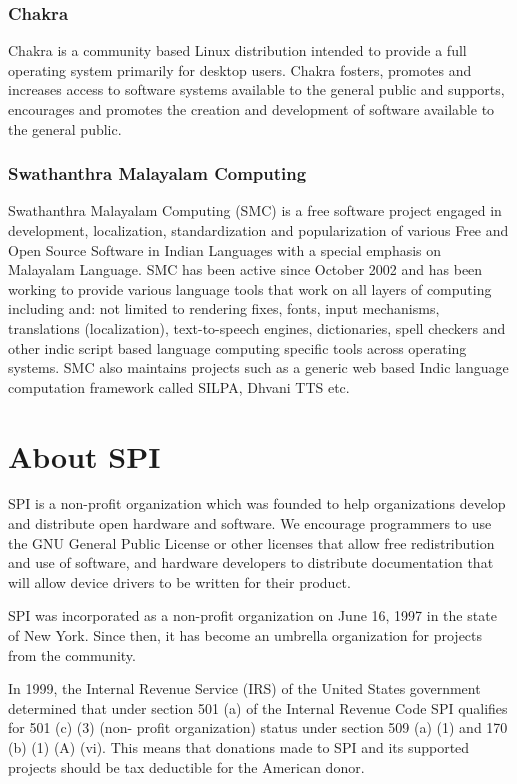 \documentclass[letterpaper]{report}
\begin{document}
\subsection{Chakra}

Chakra is a community based Linux distribution intended to provide a full
operating system primarily for desktop users.  Chakra fosters, promotes and
increases access to software systems available to the general public and
supports, encourages and promotes the creation and development of software
available to the general public.


\subsection{Swathanthra Malayalam Computing}

Swathanthra Malayalam Computing (SMC) is a free software project engaged
in development, localization, standardization and popularization of
various Free and Open Source Software in Indian Languages with a special
emphasis on Malayalam Language. SMC has been active since October 2002 and
has been working to provide various language tools that work on all layers
of computing including and: not limited to rendering fixes, fonts, input
mechanisms, translations (localization), text-to-speech engines,
dictionaries, spell checkers and other indic script based language
computing specific tools across operating systems. SMC also maintains
projects such as a generic web based Indic language computation framework
called SILPA, Dhvani TTS etc.


\appendix
\chapter{About SPI}

SPI is a non-profit organization which was founded to help organizations
develop and distribute open hardware and software. We encourage programmers
to use the GNU General Public License or other licenses that allow free
redistribution and use of software, and hardware developers to distribute
documentation that will allow device drivers to be written for their product.

SPI was incorporated as a non-profit organization on June 16, 1997 in the state
of New York. Since then, it has become an umbrella organization for projects
from the community.

In 1999, the Internal Revenue Service (IRS) of the United States government
determined that under section 501 (a) of the Internal Revenue Code SPI
qualifies for 501 (c) (3) (non- profit organization) status under section 509
(a) (1) and 170 (b) (1) (A) (vi). This means that donations made to SPI and its
supported projects should be tax deductible for the American donor.
\end{document}
